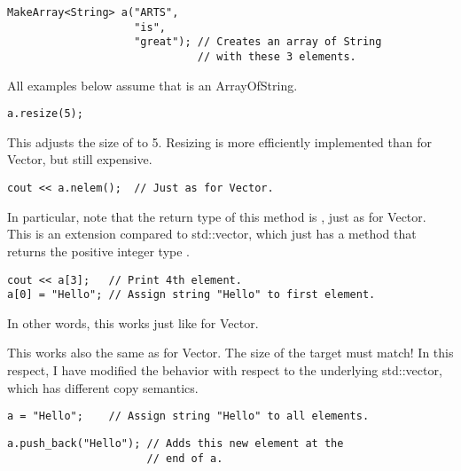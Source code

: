 \begin{verbatim}
MakeArray<String> a("ARTS",
                    "is",
                    "great"); // Creates an array of String
                              // with these 3 elements.
\end{verbatim}


All examples below assume that  is an ArrayOfString.

\begin{verbatim}
a.resize(5);
\end{verbatim}

This adjusts the size of  to 5. Resizing is more efficiently
implemented than for Vector, but still expensive.

\begin{verbatim}
cout << a.nelem();  // Just as for Vector.
\end{verbatim}

In particular, note that the return type of this method is
, just as for Vector. This is an extension compared to
std::vector, which just has a method  that returns the
positive integer type .

\begin{verbatim}
cout << a[3];   // Print 4th element.
a[0] = "Hello"; // Assign string "Hello" to first element.
\end{verbatim}

In other words, this works just like for Vector.


This works also the same as for Vector. The size of the target must
match! In this respect, I have modified the behavior with respect to
the underlying std::vector, which has different copy semantics.

\begin{verbatim}
a = "Hello";    // Assign string "Hello" to all elements.
\end{verbatim}

\begin{verbatim}
a.push_back("Hello"); // Adds this new element at the
                      // end of a.
\end{verbatim}

